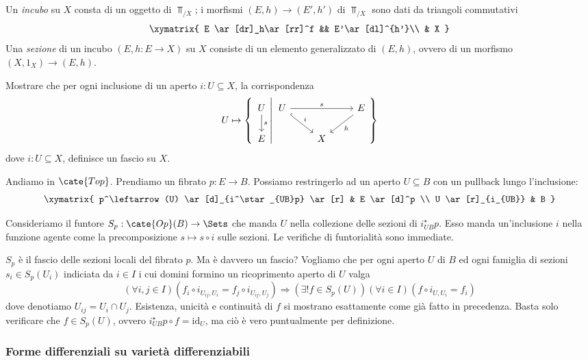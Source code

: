 Un \emph{incubo} su $X$ consta di un oggetto di $\Top_{/X}$; i morfismi $(E, h)\to (E', h')$ di $\Top_{/X}$ sono dati da triangoli commutativi
\[
\xymatrix{
E \ar[dr]_h\ar[rr]^f && E'\ar[dl]^{h'}\\
& X
}
\]
Una \emph{sezione} di un incubo $(E,h\colon E\to X)$ su $X$ consiste di un elemento generalizzato di $(E, h)$, ovvero di un morfismo $(X, 1_X)\to (E, h)$.
\begin{MyExercise}
Mostrare che per ogni inclusione di un aperto $i\colon U\subseteq X$, la corrispondenza
\[
U\mapsto 
\left\{
\left. 
\begin{tikzcd}
U \arrow[d, "s"] \\
E
\end{tikzcd}
\right|
\begin{tikzcd}
U \arrow[rr, "s"] \arrow[dr, "i", hook]&& E \arrow[dl, "h"] \\
& X &
\end{tikzcd}
\right\}
\]
dove $i\colon U\subseteq X$, definisce un fascio su $X$.
\end{MyExercise}

Andiamo in $\cate{Top}$. Prendiamo un fibrato $p:E\to B$.
Possiamo restringerlo ad un aperto $U\subseteq B$ con un pullback lungo l'inclusione:
\[\xymatrix{
p^\leftarrow(U) \ar[d]_{i^\star_{UB}p} \ar[r] & E \ar[d]^p \\
U \ar[r]_{i_{UB}} & B
}\]

Consideriamo il funtore $S_p:\cate{Op}(B)\to \Sets$ che manda $U$ nella collezione delle sezioni di $i^\star_{UB}p$. Esso manda un'inclusione $i$ nella funzione agente come la precomposizione $s\mapsto s\circ i$ sulle sezioni. Le verifiche di funtorialità sono immediate.

$S_p$ è il fascio delle sezioni locali del fibrato $p$.
Ma è davvero un fascio?
Vogliamo che per ogni aperto $U$ di $B$ ed ogni famiglia di sezioni $s_i\in S_p(U_i)$ indiciata da $i\in I$ i cui domini formino un ricoprimento aperto di $U$ valga
\[
(\forall i,j\in I)(f_i\circ i_{U_{ij},U_i}=f_j\circ i_{U_{ij},U_j})
\Rightarrow
(\exists! f\in S_p(U))(\forall i\in I)(f\circ i_{U,U_i}=f_i)
\]
dove denotiamo $U_{ij}=U_i\cap U_j$.
Esistenza, unicità e continuità di $f$ si mostrano esattamente come già fatto in precedenza.
Basta solo verificare che $f\in S_p(U)$, ovvero $i^\star_{UB}p\circ f=\mathrm{id}_U$, ma ciò è vero puntualmente per definizione.



\subsubsection*{Forme differenziali su varietà differenziabili}


